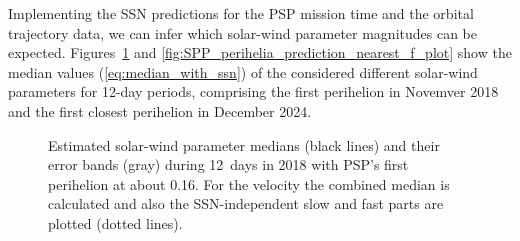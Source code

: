 \documentclass[]{aa}
\begin{document}
        Implementing the SSN predictions for the PSP mission time and the orbital trajectory data, we can infer which solar-wind parameter magnitudes can be expected. Figures~\ref{fig:SPP_perihelia_prediction_f_plot} and \ref{fig:SPP_perihelia_prediction_nearest_f_plot} show the median values (\ref{eq:median_with_ssn}) of the considered different solar-wind parameters for 12-day periods, comprising the first perihelion in Novemver 2018 and the first closest perihelion in December 2024.
        \begin{figure}
                \caption{Estimated solar-wind parameter medians (black lines) and their error bands (gray) during 12~days in 2018 with PSP's first perihelion at about \SI{0.16}{\au}. For the velocity the combined median is calculated and also the SSN-independent slow and fast parts are plotted (dotted lines).}
                \label{fig:SPP_perihelia_prediction_f_plot}
        \end{figure}
\end{document}
